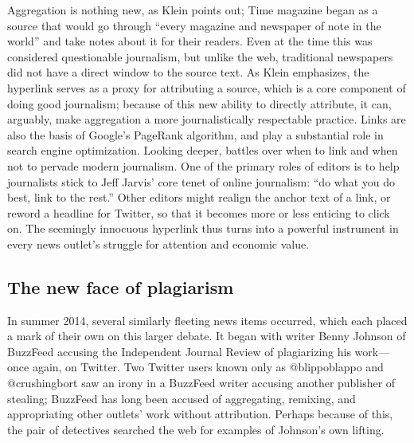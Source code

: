 Aggregation is nothing new, as Klein points out; Time magazine began as a source that would go through ``every magazine and newspaper of note in the world'' and take notes about it for their readers. Even at the time this was considered questionable journalism, but unlike the web, traditional newspapers did not have a direct window to the source text. As Klein emphasizes, the hyperlink serves as a proxy for attributing a source, which is a core component of doing good journalism; because of this new ability to directly attribute, it can, arguably, make aggregation a more journalistically respectable practice. Links are also the basis of Google's PageRank algorithm, and play a substantial role in search engine optimization. Looking deeper, battles over when to link and when not to pervade modern journalism. One of the primary roles of editors is to help journalists stick to Jeff Jarvis' core tenet of online journalism: ``do what you do best, link to the rest.''\autocite{jarvis_new_2007} Other editors might realign the anchor text of a link, or reword a headline for Twitter, so that it becomes more or less enticing to click on.\autocite{thompson_upworthy:_2013} The seemingly innocuous hyperlink thus turns into a powerful instrument in every news outlet's struggle for attention and economic value.

\subsection{The new face of plagiarism}

In summer 2014, several similarly fleeting news items occurred, which each placed a mark of their own on this larger debate. It began with writer Benny Johnson of BuzzFeed accusing the Independent Journal Review of plagiarizing his work---once again, on Twitter.\autocite{johnson_repeat_2014} Two Twitter users known only as @blippoblappo and @crushingbort saw an irony in a BuzzFeed writer accusing another publisher of stealing; BuzzFeed has long been accused of aggregating, remixing, and appropriating other outlets' work without attribution.\autocite[See, e.g.,][]{manjoo_how_2012, chen_remix_2012} Perhaps because of this, the pair of detectives searched the web for examples of Johnson's own lifting.

